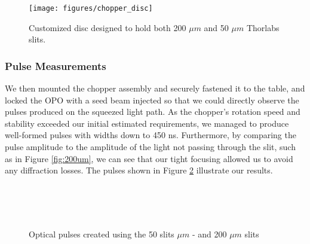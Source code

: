 \begin{figure}[!ht] 
 \centering 
 \texttt{[image: figures/chopper\_disc]} 
 \caption[Custom designed disc for optical chopper]{Customized disc designed to hold both 200 $\mu m$ and 50 $\mu m$ Thorlabs slits.} 
 \label{fig:chopper_disc} 
\end{figure}


\subsubsection{Pulse Measurements}
\label{pulse_measurements} 

We then mounted the chopper assembly and securely fastened it to the table, and locked the OPO with a seed beam injected so that we could directly observe the pulses produced on the squeezed light path.  As the chopper's rotation speed and stability exceeded our initial estimated requirements, we managed to produce well-formed pulses with widths down to 450 ns.  Furthermore, by comparing the pulse amplitude to the amplitude of the light not passing through the slit, such as in Figure \ref{fig:200um}, we can see that our tight focusing allowed us to avoid any diffraction losses. The pulses shown in Figure \ref{fig:chopper_pulses} illustrate our results.
  
\clearpage
\begin{figure}[!ht]
  \centering
   \\
  \vspace{-10pt}
   \\
  \vspace{-10pt}
   \\
  \vspace{-10pt}
  \caption[Optical chopper pulse measurements]{Optical pulses created using the 50 slits $\mu m$  -  and 200 $\mu m$ slits  }
  \label{fig:chopper_pulses}
\end{figure}

